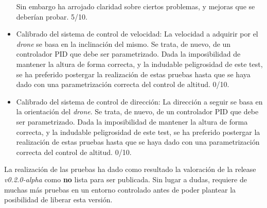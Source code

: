 \begin{itemize}
Sin embargo ha arrojado claridad sobre ciertos problemas, y mejoras que se deberían probar. 5/10.
 
 \item Calibrado del sistema de control de velocidad: La velocidad a adquirir por el \emph{drone} se basa en la inclinación del mismo. Se trata, de nuevo, de un controlador PID que debe ser parametrizado. Dada la imposibilidad de mantener la altura de forma correcta, y la indudable peligrosidad de este test, se ha preferido postergar la realización de estas pruebas hasta que se haya dado con una parametrización correcta del control de altitud. 0/10.
 
 \item Calibrado del sistema de control de dirección: La dirección a seguir se basa en la orientación del \emph{drone}. Se trata, de nuevo, de un controlador PID que debe ser parametrizado. Dada la imposibilidad de mantener la altura de forma correcta, y la indudable peligrosidad de este test, se ha preferido postergar la realización de estas pruebas hasta que se haya dado con una parametrización correcta del control de altitud. 0/10.
\end{itemize}


La realización de las pruebas ha dado como resultado la valoración de la release \emph{v0.2.0-alpha} como \textbf{no} lista para ser publicada. Sin lugar a dudas, requiere de muchas más pruebas en un entorno controlado antes de poder plantear la posibilidad de liberar esta versión. 

